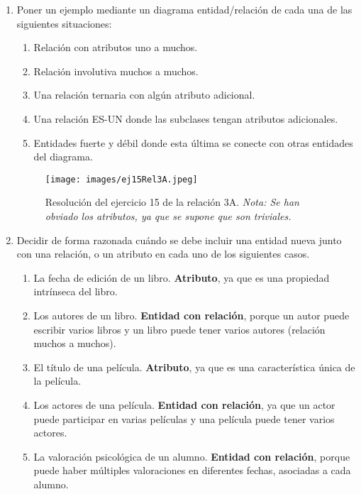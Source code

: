 \begin{enumerate}[label=\textbf{\arabic*.}, itemsep=0.5em]
    \item Poner un ejemplo mediante un diagrama entidad/relación de cada una de las siguientes situaciones:
    \begin{enumerate}
        \item Relación con atributos uno a muchos.
        \item Relación involutiva muchos a muchos.
        \item Una relación ternaria con algún atributo adicional.
        \item Una relación ES-UN donde las subclases tengan atributos adicionales.
        \item Entidades fuerte y débil donde esta última se conecte con otras entidades del diagrama.
    \end{enumerate}

    \begin{figure}[H]
        \centering
        \texttt{[image: images/ej15Rel3A.jpeg]}
        \caption{Resolución del ejercicio 15 de la relación 3A. \textit{Nota: Se han obviado los atributos, ya que se supone que son triviales.}}
        \label{fig:diagrama_1}
    \end{figure}

    

    \item Decidir de forma razonada cuándo se debe incluir una entidad nueva junto con una relación, o un atributo en cada uno de los siguientes casos.
    \begin{enumerate}
        \item La fecha de edición de un libro.  
        \textbf{Atributo}, ya que es una propiedad intrínseca del libro.

        \item Los autores de un libro.  
        \textbf{Entidad con relación}, porque un autor puede escribir varios libros y un libro puede tener varios autores (relación muchos a muchos).

        \item El título de una película.  
        \textbf{Atributo}, ya que es una característica única de la película.

        \item Los actores de una película.  
        \textbf{Entidad con relación}, ya que un actor puede participar en varias películas y una película puede tener varios actores.

        \item La valoración psicológica de un alumno.  
        \textbf{Entidad con relación}, porque puede haber múltiples valoraciones en diferentes fechas, asociadas a cada alumno.


\end{enumerate}
\end{enumerate}

